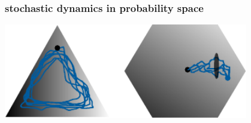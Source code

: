 \begin{frame}
\vspace{1em}
\frametitle{stochastic dynamics in probability space}
\begin{center}
\includegraphics[width=0.8\textwidth]{fig/stochdynss.pdf}
\end{center}
\end{frame}
